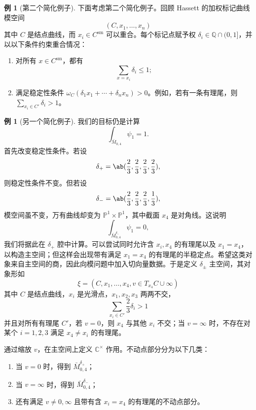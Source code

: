 \documentclass{amsart}
\theoremstyle{definition}
\newtheorem{exm}[thm]{例}
\theoremstyle{remark}
\theoremstyle{plain}
\theoremstyle{definition}
\theoremstyle{remark}
\newcommand{\C}{\mathbb{C}}
\newcommand{\Q}{\mathbb{Q}}
\renewcommand{\P}{\mathbb{P}}
\newcommand{\mr}[1]{\mathrm{#1}}
\newcommand{\1}{\mathbf{1}}
\newcommand{\2}{\mathbf{2}}
\newcommand{\3}{\mathbf{3}}
\begin{document}
\begin{exm}[第二个简化例子]
    下面考虑第二个简化例子。回顾 Hassett 的加权标记曲线模空间
    \[ (C, x_1, \ldots, x_n) \]
    其中 \(C\) 是结点曲线，而 \(x_i \in C^{\mr{sm}}\) 可以重合。每个标记点赋予权 \(\delta_i \in \Q \cap (0,1]\)，并以以下条件约束重合情况：
    \begin{enumerate}
        \item 对所有 \(x \in C^{\mr{sm}}\)，都有
            \[ \sum_{x = x_i} \delta_i \leq 1; \]
        \item 满足稳定性条件 \(\omega_C(\delta_1 x_1 + \cdots + \delta_n x_n) > 0\)。例如，若有一条有理尾，则 \(\sum_{x_i \in C'} \delta_i > 1\)。
    \end{enumerate}
\end{exm}

\begin{exm}[另一个简化例子]
    我们的目标仍是计算
    \[ \int_{\bar{M}_{0,4}} \psi_1 = 1. \]
    首先改变稳定性条件。若设
    \[ \delta_+ = \ab(\frac{2}{3}, \frac{2}{3}, \frac{2}{3}, \frac{2}{3}), \]
    则稳定性条件不变。但若设
    \[ \delta_- = \ab(\frac{2}{3}, \frac{2}{3}, \frac{2}{3}, \frac{1}{3}), \]
    模空间虽不变，万有曲线却变为 \(\P^1 \times \P^1\)，其中截面 \(x_4\) 是对角线。这说明
    \[ \int_{\bar{M}_{0,4}^{\delta_-}} \psi_1 = 0, \]
    我们将据此在 \(\delta_+\) 腔中计算。可以尝试同时允许含 \(x_i, x_4\) 的有理尾以及 \(x_1 = x_4\)，以构造主空间；但这样会出现带有满足 \(x_1 = x_4\) 的有理尾的半稳定点。希望这类对象来自主空间的商，因此向模问题中加入切向量数据。于是定义 \(\delta_{\pm}\) 主空间，其对象形如
    \[ \xi = (C, x_1, \ldots, x_4, v \in T_{x_4} C \cup \infty) \]
    其中 \(C\) 是结点曲线，\(x_i\) 是光滑点，\(x_1, x_2, x_3\) 两两不交，
    \[ \sum_{x_i \in C'} \frac{2}{3} \delta_i > 1 \]
    并且对所有有理尾 \(C'\)，若 \(v = 0\)，则 \(x_4\) 与其他 \(x_i\) 不交；当 \(v = \infty\) 时，不存在对某个 \(i = 1,2,3\) 满足 \(x_4 \neq x_i\) 的有理尾。

    通过缩放 \(v\)，在主空间上定义 \(\C^{\times}\) 作用。不动点部分分为以下几类：
    \begin{enumerate}
        \item 当 \(v = 0\) 时，得到 \(\bar{M}_{0,4}^{\delta_+}\)；
        \item 当 \(v = \infty\) 时，得到 \(\bar{M}_{0,4}^{\delta_-}\)；
        \item 还有满足 \(v \neq 0,\infty\) 且带有含 \(x_i = x_4\) 的有理尾的不动点部分。
    \end{enumerate}


\end{exm}
\end{document}
